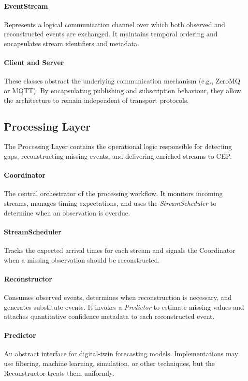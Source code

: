 \paragraph*{EventStream}
Represents a logical communication channel over which both observed and reconstructed events are exchanged. It maintains temporal ordering and encapsulates stream identifiers and metadata.

\paragraph*{Client and Server}
These classes abstract the underlying communication mechanism (e.g., ZeroMQ or MQTT). By encapsulating publishing and subscription behaviour, they allow the architecture to remain independent of transport protocols.

\subsection{Processing Layer}

The Processing Layer contains the operational logic responsible for detecting gaps, reconstructing missing events, and delivering enriched streams to CEP.

\paragraph*{Coordinator}
The central orchestrator of the processing workflow. It monitors incoming streams, manages timing expectations, and uses the \textit{StreamScheduler} to determine when an observation is overdue.

\paragraph*{StreamScheduler}
Tracks the expected arrival times for each stream and signals the Coordinator when a missing observation should be reconstructed.

\paragraph*{Reconstructor}
Consumes observed events, determines when reconstruction is necessary, and generates substitute events. It invokes a \textit{Predictor} to estimate missing values and attaches quantitative confidence metadata to each reconstructed event.

\paragraph*{Predictor}
An abstract interface for digital-twin forecasting models. Implementations may use filtering, machine learning, simulation, or other techniques, but the Reconstructor treats them uniformly.

